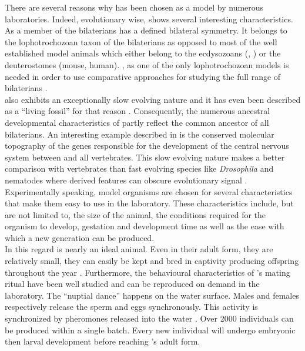      There are several reasons why \platy{} has been chosen as a model by numerous laboratories. Indeed, evolutionary wise, \platy{} shows several interesting characteristics.  As a member of the bilaterians \platy{} has a defined bilateral symmetry. It belongs to the lophotrochozoan taxon of the bilaterians as opposed to most of the well established model animals which either belong to the ecdysozoans (, ) or the deuterostomes (mouse, human). \platy{}, as one of the only lophotrochozoan models is needed in order to use comparative approaches for studying the full range of bilaterians \cite{Fischer10}.\\
     
     \platy{} also exhibits an exceptionally slow evolving nature and it has even been described as a ``living fossil'' for that reason \cite{Fischer10}. Consequently, the numerous ancestral developmental characteristics of \platy{} partly reflect the common ancestor of all bilaterians. An interesting example described in \cite{denes07,tessmar07} is the conserved molecular topography of the genes responsible for the development of the central nervous system between \platy{} and all vertebrates. This slow evolving nature makes \platy{} a better comparison with vertebrates than fast evolving species like \emph{Drosophila} and nematodes where derived features can obscure evolutionary signal \cite{Fischer10,arendt124}.\\
     
     Experimentally speaking, model organisms are chosen for several characteristics that make them easy to use in the laboratory. These characteristics include, but are not limited to, the size of the animal, the conditions required for the organism to develop, gestation and development time as well as the ease with which a new generation can be produced.\\
     
     In this regard \platy{} is nearly an ideal animal. Even in their adult form, they are relatively small, they can easily be kept and bred in captivity producing offspring throughout the year \cite{fischer04}. Furthermore, the behavioural characteristics of \platy{}'s mating ritual have been well studied and can be reproduced on demand in the laboratory. The ``nuptial dance'' happens on the water surface. Males and females respectively release the sperm and eggs synchronously. This activity is synchronized by pheromones released into the water \cite{zeeck98}. Over 2000 individuals can be produced within a single batch. Every new individual will undergo embryonic then larval development before reaching \platy{}'s adult form.\\

